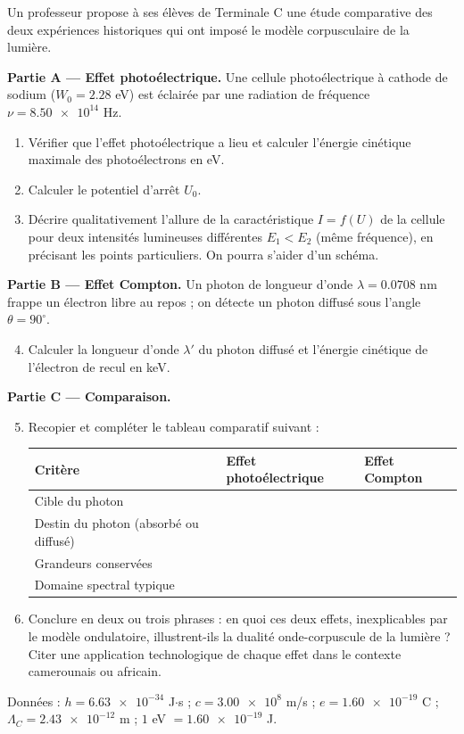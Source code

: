 \documentclass[11pt]{article}
\providecommand{\degree}{^{\circ}}
\begin{document}
\begin{exercice}
Un professeur propose à ses élèves de Terminale C une étude comparative des deux expériences historiques qui ont imposé le modèle corpusculaire de la lumière.

\textbf{Partie A — Effet photoélectrique.} Une cellule photoélectrique à cathode de sodium ($W_0 = \num{2,28}$ eV) est éclairée par une radiation de fréquence $\nu = \num{8,50e14}$ Hz.
\begin{enumerate}
\item Vérifier que l'effet photoélectrique a lieu et calculer l'énergie cinétique maximale des photoélectrons en eV.
\item Calculer le potentiel d'arrêt $U_0$.
\item Décrire qualitativement l'allure de la caractéristique $I = f(U)$ de la cellule pour deux intensités lumineuses différentes $E_1 < E_2$ (même fréquence), en précisant les points particuliers. On pourra s'aider d'un schéma.
\end{enumerate}

\textbf{Partie B — Effet Compton.} Un photon de longueur d'onde $\lambda = \num{0,0708}$ nm frappe un électron libre au repos ; on détecte un photon diffusé sous l'angle $\theta = 90\degree$.
\begin{enumerate}
\setcounter{enumi}{3}
\item Calculer la longueur d'onde $\lambda'$ du photon diffusé et l'énergie cinétique de l'électron de recul en keV.
\end{enumerate}

\textbf{Partie C — Comparaison.}
\begin{enumerate}
\setcounter{enumi}{4}
\item Recopier et compléter le tableau comparatif suivant :
\begin{center}
\begin{tabularx}{\linewidth}{|l|X|X|}
\hline
\rowcolor{popblueL} \textbf{Critère} & \textbf{Effet photoélectrique} & \textbf{Effet Compton} \\
\hline Cible du photon & & \\
\hline Destin du photon (absorbé ou diffusé) & & \\
\hline Grandeurs conservées & & \\
\hline Domaine spectral typique & & \\
\hline
\end{tabularx}
\end{center}
\item Conclure en deux ou trois phrases : en quoi ces deux effets, inexplicables par le modèle ondulatoire, illustrent-ils la dualité onde-corpuscule de la lumière ? Citer une application technologique de chaque effet dans le contexte camerounais ou africain.
\end{enumerate}
Données : $h = \num{6,63e-34}$ J$\cdot$s ; $c = \num{3,00e8}$ m/s ; $e = \num{1,60e-19}$ C ; $\Lambda_C = \num{2,43e-12}$ m ; $\num{1}$ eV $= \num{1,60e-19}$ J.
\end{exercice}
\end{document}
